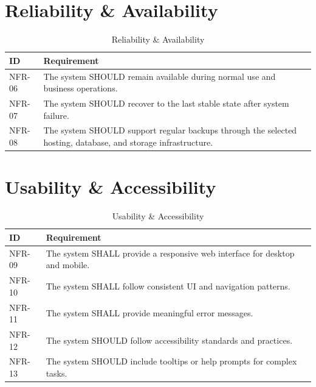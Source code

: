 \section{Reliability \& Availability}

\begin{table}[H]
\centering
\setlength{\tabcolsep}{6pt}
\renewcommand{\arraystretch}{1.05}
\small
\caption{Reliability \& Availability}
\begin{tabular}{|p{2.2cm}|p{12cm}|}
\hline
\textbf{ID} & \textbf{Requirement} \\
\hline
NFR-06 & The system SHOULD remain available during normal use and business operations. \\
\hline
NFR-07 & The system SHOULD recover to the last stable state after system failure. \\
\hline
NFR-08 & The system SHOULD support regular backups through the selected hosting, database, and storage infrastructure. \\
\hline
\end{tabular}
\end{table}

\section{Usability \& Accessibility}

\begin{table}[H]
\centering
\setlength{\tabcolsep}{6pt}
\renewcommand{\arraystretch}{1.05}
\small
\caption{Usability \& Accessibility}
\begin{tabular}{|p{2.2cm}|p{12cm}|}
\hline
\textbf{ID} & \textbf{Requirement} \\
\hline
NFR-09 & The system SHALL provide a responsive web interface for desktop and mobile. \\
\hline
NFR-10 & The system SHALL follow consistent UI and navigation patterns. \\
\hline
NFR-11 & The system SHALL provide meaningful error messages. \\
\hline
NFR-12 & The system SHOULD follow accessibility standards and practices. \\
\hline
NFR-13 & The system SHOULD include tooltips or help prompts for complex tasks. \\
\hline
\end{tabular}
\end{table}

